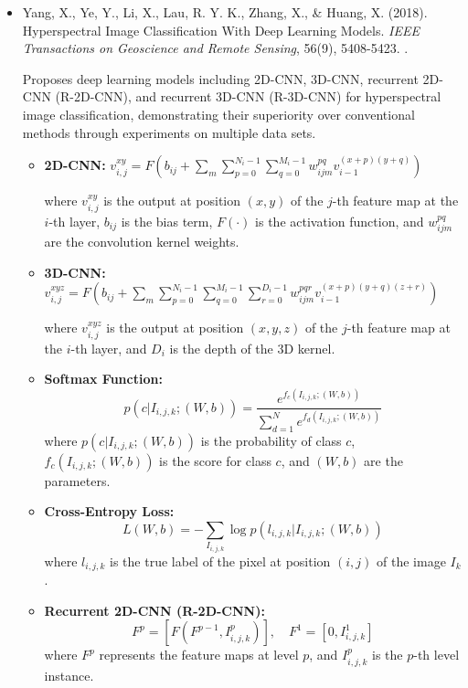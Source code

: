 \documentclass[10pt,svgnames,fragile]{beamer}
\begin{document}
\begin{frame}
\tiny
\begin{itemize}

    \item Yang, X., Ye, Y., Li, X., Lau, R. Y. K., Zhang, X., \& Huang, X. (2018). Hyperspectral Image Classification With Deep Learning Models. \textit{IEEE Transactions on Geoscience and Remote Sensing}, 56(9), 5408-5423. \href{https://doi.org/10.1109/TGRS.2018.2815613}{\color{blue}{DOI: 10.1109/TGRS.2018.2815613}}. \cite{yangHyperspectralImageClassification2018}

    {\color{gray}Proposes deep learning models including 2D-CNN, 3D-CNN, recurrent 2D-CNN (R-2D-CNN), and recurrent 3D-CNN (R-3D-CNN) for hyperspectral image classification, demonstrating their superiority over conventional methods through experiments on multiple data sets.}
    \begin{itemize} \tiny
    \item \textbf{2D-CNN:}
    \(
    v_{i,j}^{xy} = F \left( b_{ij} + \sum_{m} \sum_{p=0}^{N_i-1} \sum_{q=0}^{M_i-1} w_{ijm}^{pq} v_{i-1}^{(x+p)(y+q)} \right)
    \)
    
    where \( v_{i,j}^{xy} \) is the output at position \((x, y)\) of the \(j\)-th feature map at the \(i\)-th layer, \(b_{ij}\) is the bias term, \(F(\cdot)\) is the activation function, and \(w_{ijm}^{pq}\) are the convolution kernel weights.

    \item \textbf{3D-CNN:}
    \(
    v_{i,j}^{xyz} = F \left( b_{ij} + \sum_{m} \sum_{p=0}^{N_i-1} \sum_{q=0}^{M_i-1} \sum_{r=0}^{D_i-1} w_{ijm}^{pqr} v_{i-1}^{(x+p)(y+q)(z+r)} \right)
    \)
    
    where \( v_{i,j}^{xyz} \) is the output at position \((x, y, z)\) of the \(j\)-th feature map at the \(i\)-th layer, and \(D_i\) is the depth of the 3D kernel.

    \item \textbf{Softmax Function:}
    \[
    p(c|I_{i,j,k}; (W, b)) = \frac{e^{f_c(I_{i,j,k}; (W, b))}}{\sum_{d=1}^{N} e^{f_d(I_{i,j,k}; (W, b))}}
    \]
    where \( p(c|I_{i,j,k}; (W, b)) \) is the probability of class \(c\), \( f_c(I_{i,j,k}; (W, b)) \) is the score for class \(c\), and \( (W, b) \) are the parameters.

    \item \textbf{Cross-Entropy Loss:}
    \[
    L(W, b) = - \sum_{I_{i,j,k}} \log p(l_{i,j,k} | I_{i,j,k}; (W, b))
    \]
    where \( l_{i,j,k} \) is the true label of the pixel at position \((i, j)\) of the image \( I_k \).

    \item \textbf{Recurrent 2D-CNN (R-2D-CNN):}
    \[
    F^p = [F(F^{p-1}, I_{i,j,k}^p)], \quad F^1 = [0, I_{i,j,k}^1]
    \]
    where \( F^p \) represents the feature maps at level \(p\), and \( I_{i,j,k}^p \) is the \(p\)-th level instance.
    \end{itemize}
    
\end{itemize}
\end{frame}
\end{document}
